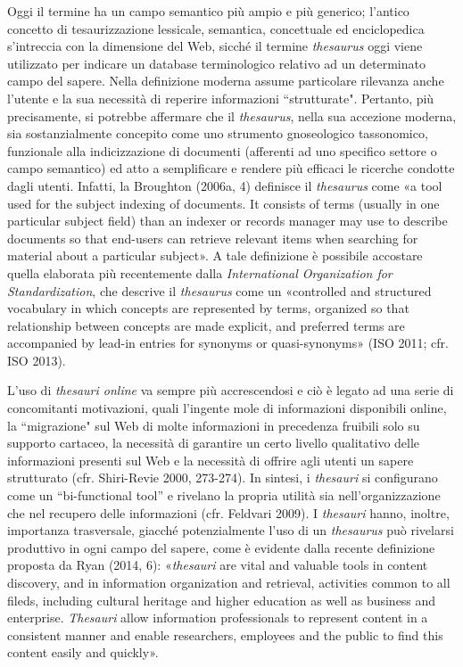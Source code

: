 \documentclass[
  b5paper,
  twoside,
  12pt,
  chapterprefix=false,
  bibliography=totocnumbered,
  parskip=false]{scrbook}
\begin{document}
Oggi il termine ha un campo semantico più ampio e più generico; l'antico
concetto di tesaurizzazione lessicale, semantica, concettuale ed
enciclopedica s'intreccia con la dimensione del Web, sicché il termine
\emph{thesaurus} oggi viene utilizzato per indicare un database terminologico
relativo ad un determinato campo del sapere. Nella definizione moderna
assume particolare rilevanza anche l'utente e la sua necessità di
reperire informazioni ``strutturate". Pertanto, più precisamente, si
potrebbe affermare che il \emph{thesaurus}, nella sua accezione moderna, sia
sostanzialmente concepito come uno strumento gnoseologico tassonomico,
funzionale alla indicizzazione di documenti (afferenti ad uno specifico
settore o campo semantico) ed atto a semplificare e rendere più efficaci
le ricerche condotte dagli utenti. Infatti, la Broughton (2006a, 4)
definisce il \emph{thesaurus} come «a tool used for the subject indexing of
documents. It consists of terms (usually in one particular subject
field) than an indexer or records manager may use to describe documents
so that end-users can retrieve relevant items when searching for
material about a particular subject». A tale definizione è possibile
accostare quella elaborata più recentemente dalla \emph{International
Organization for Standardization}, che descrive il \emph{thesaurus} come un
«controlled and structured vocabulary in which concepts are represented
by terms, organized so that relationship between concepts are made
explicit, and preferred terms are accompanied by lead-in entries for
synonyms or quasi-synonyms» (ISO 2011; cfr. ISO 2013).

L'uso di \emph{thesauri online} va sempre più accrescendosi e ciò è legato ad
una serie di concomitanti motivazioni, quali l'ingente mole di
informazioni disponibili online, la ``migrazione" sul Web di molte
informazioni in precedenza fruibili solo su supporto cartaceo, la
necessità di garantire un certo livello qualitativo delle informazioni
presenti sul Web e la necessità di offrire agli utenti un sapere
strutturato (cfr. Shiri-Revie 2000, 273-274). In sintesi, i \emph{thesauri}
si configurano come un \enquote{bi-functional tool} e rivelano la propria
utilità sia nell'organizzazione che nel recupero delle informazioni
(cfr. Feldvari 2009). I \emph{thesauri} hanno, inoltre, importanza
trasversale, giacché potenzialmente l'uso di un \emph{thesaurus} può
rivelarsi produttivo in ogni campo del sapere, come è evidente dalla
recente definizione proposta da Ryan (2014, 6): «\emph{thesauri} are vital
and valuable tools in content discovery, and in information organization
and retrieval, activities common to all fileds, including cultural
heritage and higher education as well as business and enterprise.
\emph{Thesauri} allow information professionals to represent content in a
consistent manner and enable researchers, employees and the public to
find this content easily and quickly».
\end{document}
